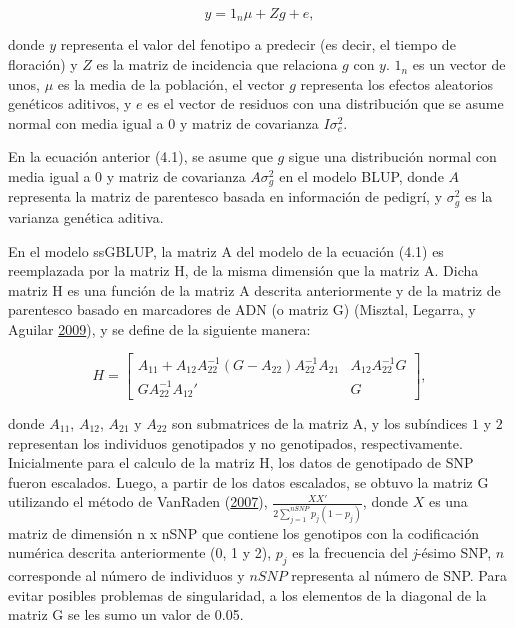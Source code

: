 \documentclass[11pt,spanish,a4paper,oneside,]{book} %
\begin{document}
\begin{equation}
y = 1_{n} \mu + Zg + e,
\end{equation}

donde \(y\) representa el valor del fenotipo a predecir (es decir, el tiempo de floración) y \(Z\) es la matriz de incidencia que relaciona \(g\) con \(y\). \(1_{n}\) es un vector de unos, \(\mu\) es la media de la población, el vector \(g\) representa los efectos aleatorios genéticos aditivos, y \(e\) es el vector de residuos con una distribución que se asume normal con media igual a \(0\) y matriz de covarianza \(I\sigma^{2}_{e}\).

En la ecuación anterior (4.1), se asume que \(g\) sigue una distribución normal con media igual a \(0\) y matriz de covarianza \(A\sigma^{2}_{g}\) en el modelo BLUP, donde \(A\) representa la matriz de parentesco basada en información de pedigrí, y \(\sigma^{2}_{g}\) es la varianza genética aditiva.

En el modelo ssGBLUP, la matriz A del modelo de la ecuación (4.1) es reemplazada por la matriz H, de la misma dimensión que la matriz A. Dicha matriz H es una función de la matriz A descrita anteriormente y de la matriz de parentesco basado en marcadores de ADN (o matriz G) (Misztal, Legarra, y Aguilar \protect\hyperlink{ref-cite:16}{2009}), y se define de la siguiente manera:

\begin{equation}
H =
\begin{bmatrix}
A_{11} + A_{12} A_{22}^{-1} ( G - A_{22} ) A_{22}^{-1}  A_{21} & A_{12} A_{22}^{-1} G \\ 
G A_{22}^{-1} A_{12}' & G 
\end{bmatrix}
,
\end{equation}

donde \(A_{11}\), \(A_{12}\), \(A_{21}\) y \(A_{22}\) son submatrices de la matriz A, y los subíndices \(1\) y \(2\) representan los individuos genotipados y no genotipados, respectivamente. Inicialmente para el calculo de la matriz H, los datos de genotipado de SNP fueron escalados. Luego, a partir de los datos escalados, se obtuvo la matriz G utilizando el método de VanRaden (\protect\hyperlink{ref-cite:39}{2007}), \(\frac{XX'}{2 \sum_{j=1}^{nSNP} p_{j} (1 - p_{j})}\), donde \(X\) es una matriz de dimensión n x nSNP que contiene los genotipos con la codificación numérica descrita anteriormente (0, 1 y 2), \(p_{j}\) es la frecuencia del \emph{j}-ésimo SNP, \(n\) corresponde al número de individuos y \(nSNP\) representa al número de SNP. Para evitar posibles problemas de singularidad, a los elementos de la diagonal de la matriz G se les sumo un valor de 0.05.
\end{document}
